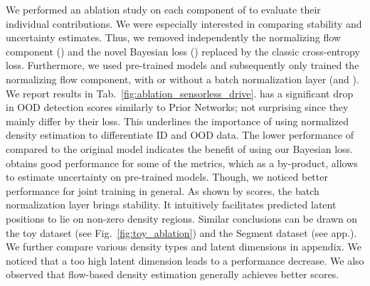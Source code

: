 We performed an ablation study on each component of \oursacro to evaluate their individual contributions. We were especially interested in comparing stability and uncertainty estimates. Thus, we removed independently the normalizing flow component (\NoFlow) and the novel Bayesian loss (\NoUCE) replaced by the classic cross-entropy loss. Furthermore, we used pre-trained models and subsequently only trained the normalizing flow component, with or without a batch normalization layer (\SeqBn and \SeqNoBn). We report results in Tab.~\ref{fig:ablation_sensorless_drive}. \NoFlow has a significant drop in OOD detection scores similarly to Prior Networks; not surprising since they mainly differ by their loss. This underlines the importance of using normalized density estimation to differentiate ID and OOD data. The lower performance of \NoUCE compared to the original model indicates the benefit of using our Bayesian loss.
 \SeqBn obtains good performance for some of the metrics, which as a by-product, allows to estimate uncertainty on pre-trained models. Though, we noticed better performance for joint training in general. As shown by \SeqNoBn scores, the batch normalization layer brings stability. It intuitively facilitates predicted latent positions to lie on non-zero density regions. Similar conclusions can be drawn on the toy dataset (see Fig.~\ref{fig:toy_ablation}) and the Segment dataset (see app.). We further compare various density types and latent dimensions in appendix. We noticed that a too high latent dimension leads to a performance decrease. We also observed that flow-based density estimation generally achieves better scores.


